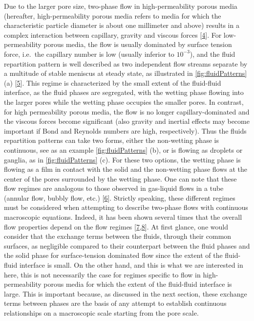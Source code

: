 \documentclass[]{article}
\begin{document}
Due to the larger pore size, two-phase flow in high-permeability porous
media (hereafter, high-permeability porous media refers to media for
which the characteristic particle diameter is about one millimeter and
above) results in a complex interaction between capillary, gravity and
viscous forces {[}\protect\hyperlink{ref-davit2018one}{4}{]}. For
low-permeability porous media, the flow is usually dominated by surface
tension force, i.e.~the capillary number is low (usually inferior to
\(10^{-3}\)), and the fluid repartition pattern is well described as two
independent flow streams separate by a multitude of stable meniscus at
steady state, as illustrated in \cref{fig:fluidPatterns} (a)
{[}\protect\hyperlink{ref-dullien2012porous}{5}{]}. This regime is
characterized by the small extent of the fluid-fluid interface, as the
fluid phases are segregated, with the wetting phase flowing into the
larger pores while the wetting phase occupies the smaller pores. In
contrast, for high permeability porous media, the flow is no longer
capillary-dominated and the viscous forces become significant (also
gravity and inertial effects may become important if Bond and Reynolds
numbers are high, respectively). Thus the fluids repartition patterns
can take two forms, either the non-wetting phase is continuous, see as
an example \cref{fig:fluidPatterns} (b), or is flowing as droplets or
ganglia, as in \cref{fig:fluidPatterns} (c). For these two options, the
wetting phase is flowing as a film in contact with the solid and the
non-wetting phase flows at the center of the pores surrounded by the
wetting phase. One can note that these flow regimes are analogous to
those observed in gas-liquid flows in a tube (annular flow, bubbly flow,
etc.) {[}\protect\hyperlink{ref-taitel1976model}{6}{]}. Strictly
speaking, these different regimes must be considered when attempting to
describe two-phase flows with continuous macroscopic equations. Indeed,
it has been shown several times that the overall flow properties depend
on the flow regimes
{[}\protect\hyperlink{ref-Avraam1995a}{7},\protect\hyperlink{ref-armstrong2016beyond}{8}{]}.
At first glance, one would consider that the exchange terms between the
fluids, through their common surfaces, as negligible compared to their
counterpart between the fluid phases and the solid phase for
surface-tension dominated flow since the extent of the fluid-fluid
interface is small. On the other hand, and this is what we are
interested in here, this is not necessarily the case for regimes
specific to flow in high-permeability porous media for which the extent
of the fluid-fluid interface is large. This is important because, as
discussed in the next section, these exchange terms between phases are
the basis of any attempt to establish continuous relationships on a
macroscopic scale starting from the pore scale.
\end{document}
